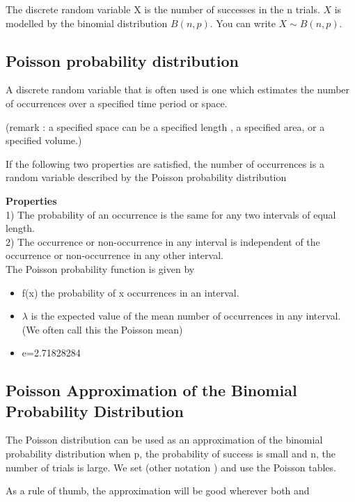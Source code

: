 \documentclass[12pt]{article}
\begin{document}
The discrete random variable X is the number of successes in the n trials. 
$X$ is modelled by the binomial distribution $B(n,p)$. You can write $X \sim B(n, p)$.



\subsection{Poisson probability distribution}

A discrete random variable that is often used is one which estimates the number of occurrences  over a specified time period or space.

(remark : a specified space can be a specified length , a specified area, or a specified volume.)

If the following two properties are satisfied, the number of occurrences is a random variable described by the Poisson probability distribution

\textbf{Properties}\\
1)      The probability of an occurrence is the same for any two intervals of equal length.\\
2)      The occurrence or non-occurrence in any interval is independent of the occurrence or non-occurrence in any other interval.\\

The Poisson probability function is given by

 
 
\begin{itemize} 
\item	f(x) the probability of x occurrences in an interval. 
\item	$\lambda$ is the expected value of the mean number of occurrences in any interval. (We often call this the Poisson mean)
\item	e=2.71828284
\end{itemize} 

\subsection{Poisson Approximation of the Binomial Probability Distribution}

The Poisson distribution can be used  as an approximation of the binomial probability distribution when p, the probability of success is small and n, the number of trials is large.
We set   (other notation  )  and use the Poisson tables. 
 
As a rule of thumb, the approximation will be good wherever both  and  
 
\end{document}
